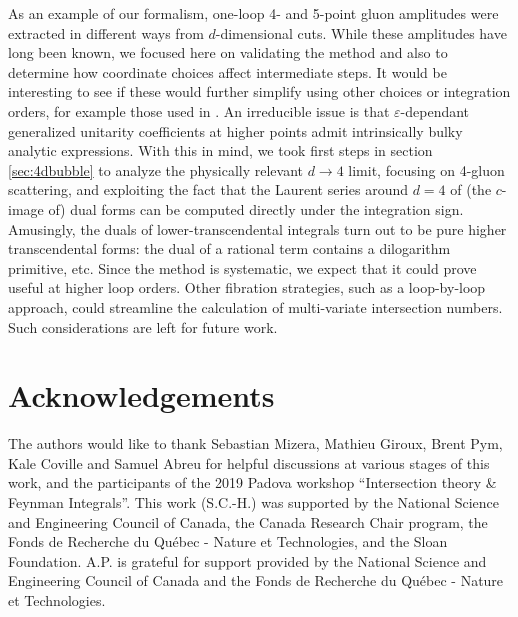 \documentclass[11pt]{article}
\newcommand{\vep}{\varepsilon}
\begin{document}
As an example of our formalism, one-loop 4- and 5-point gluon amplitudes were extracted in different ways from $d$-dimensional cuts.
While these amplitudes have long been known, we focused here on validating the method and also
to determine how coordinate choices affect intermediate steps.  It would be interesting to see if these would further simplify using other choices
or integration orders, for example those used in \cite{Badger:2008cm}.
An irreducible issue is that $\vep$-dependant generalized unitarity coefficients at higher points admit intrinsically
bulky analytic expressions. %
With this in mind, we took first steps in section \ref{sec:4dbubble} to analyze the physically relevant $d\to 4$ limit,
focusing on 4-gluon scattering, and exploiting the fact that the Laurent series around $d=4$ of (the $c$-image of) dual forms can be computed directly under
the integration sign. Amusingly, the duals of lower-transcendental integrals turn out to be pure higher transcendental forms: 
the dual of a rational term contains a dilogarithm primitive, etc.
Since the method is systematic, we expect that it could prove useful at higher loop orders. 
Other fibration strategies, such as a loop-by-loop approach, could streamline the calculation of multi-variate intersection numbers. 
Such considerations are left for future work. 

\section{Acknowledgements}
The authors would like to thank Sebastian Mizera, Mathieu Giroux, Brent Pym, Kale Coville and Samuel Abreu for helpful discussions at various stages of this work, and the participants of the 2019 Padova workshop ``Intersection theory \& Feynman Integrals''. 
This work (S.C.-H.) was supported by the National Science and Engineering Council of Canada, the Canada Research Chair program,
the Fonds de Recherche du Qu\'ebec - Nature et Technologies, and the Sloan Foundation.
A.P. is grateful for support provided by the National Science and Engineering Council of Canada and the Fonds de Recherche du Qu\'ebec - Nature et Technologies.

\appendix
\end{document}
